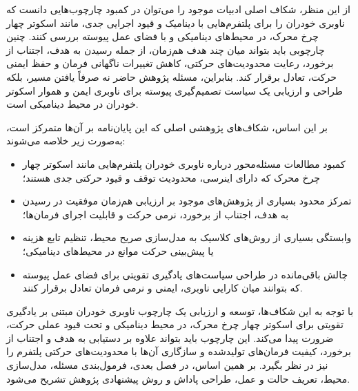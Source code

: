از این منظر، شکاف اصلی ادبیات موجود را می‌توان در کمبود چارچوب‌هایی دانست که ناوبری خودران را برای پلتفرم‌هایی با دینامیک و قیود اجرایی جدی، مانند اسکوتر چهار چرخ محرک، در محیط‌های دینامیکی و با فضای عمل پیوسته بررسی کنند. چنین چارچوبی باید بتواند میان چند هدف هم‌زمان، از جمله رسیدن به هدف، اجتناب از برخورد، رعایت محدودیت‌های حرکتی، کاهش تغییرات ناگهانی فرمان و حفظ ایمنی حرکت، تعادل برقرار کند. بنابراین، مسئله پژوهش حاضر نه صرفاً یافتن مسیر، بلکه طراحی و ارزیابی یک سیاست تصمیم‌گیری پیوسته برای ناوبری ایمن و هموار اسکوتر خودران در محیط دینامیکی است.

بر این اساس، شکاف‌های پژوهشی اصلی که این پایان‌نامه بر آن‌ها متمرکز است، به‌صورت زیر خلاصه می‌شوند:
\begin{itemize}
	\item کمبود مطالعات مسئله‌محور درباره ناوبری خودران پلتفرم‌هایی مانند اسکوتر چهار چرخ محرک که دارای اینرسی، محدودیت توقف و قیود حرکتی جدی هستند؛
	\item تمرکز محدود بسیاری از پژوهش‌های موجود بر ارزیابی هم‌زمان موفقیت در رسیدن به هدف، اجتناب از برخورد، نرمی حرکت و قابلیت اجرای فرمان‌ها؛
	\item وابستگی بسیاری از روش‌های کلاسیک به مدل‌سازی صریح محیط، تنظیم تابع هزینه یا پیش‌بینی حرکت موانع در محیط‌های دینامیکی؛
	\item چالش باقی‌مانده در طراحی سیاست‌های یادگیری تقویتی برای فضای عمل پیوسته که بتوانند میان کارایی ناوبری، ایمنی و نرمی فرمان تعادل برقرار کنند.
\end{itemize}

با توجه به این شکاف‌ها، توسعه و ارزیابی یک چارچوب ناوبری خودران مبتنی بر یادگیری تقویتی برای اسکوتر چهار چرخ محرک، در محیط دینامیکی و تحت قیود عملی حرکت، ضرورت پیدا می‌کند. این چارچوب باید بتواند علاوه بر دستیابی به هدف و اجتناب از برخورد، کیفیت فرمان‌های تولیدشده و سازگاری آن‌ها با محدودیت‌های حرکتی پلتفرم را نیز در نظر بگیرد. بر همین اساس، در فصل بعدی، فرمول‌بندی مسئله، مدل‌سازی محیط، تعریف حالت و عمل، طراحی پاداش و روش پیشنهادی پژوهش تشریح می‌شود.